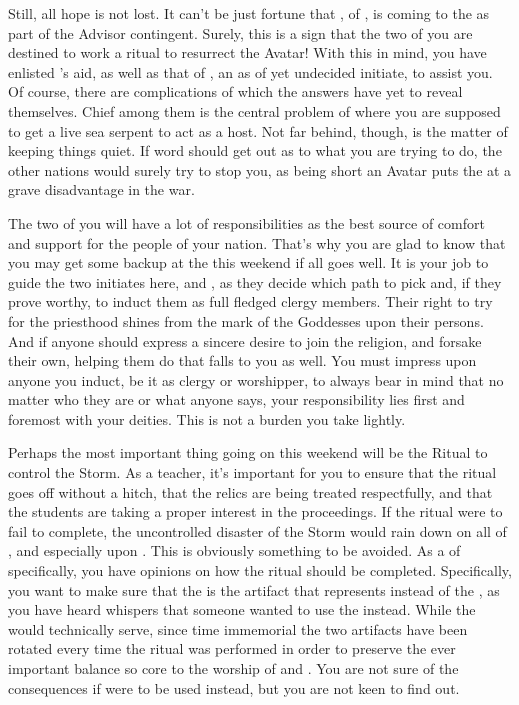 \documentclass[char]{GL2020}
\begin{document}
Still, all hope is not lost. It can’t be just fortune that \cEbbPriest{}, \cEbbPriest{\cleric} of \cEbb{}, is coming to the \pSchool{} as part of the \pShip{} Advisor contingent. Surely, this is a sign that the two of you are destined to work a ritual to resurrect the Avatar! With this in mind, you have enlisted \cEbbPriest{}’s aid, as well as that of \cInitiate{}, an as of yet undecided initiate, to assist you. Of course, there are complications of which the answers have yet to reveal themselves. Chief among them is the central problem of where you are supposed to get a live sea serpent to act as a host. Not far behind, though, is the matter of keeping things quiet. If word should get out as to what you are trying to do, the other nations would surely try to stop you, as being short an Avatar puts the \pShippies{} at a grave disadvantage in the war. 

The two of you will have a lot of responsibilities as the best source of comfort and support for the people of your nation. That’s why you are glad to know that you may get some backup at the \pSc{} this weekend if all goes well. It is your job to guide the two initiates here, \cInitiate{} and \cWarlordDaughter{}, as they decide which path to pick and, if they prove worthy, to induct them as full fledged clergy members. Their right to try for the priesthood shines from the mark of the Goddesses upon their persons. And if anyone should express a sincere desire to join the \pShip{} religion, and forsake their own, helping them do that falls to you as well. You must impress upon anyone you induct, be it as clergy or worshipper, to always bear in mind that no matter who they are or what anyone says, your responsibility lies first and foremost with your deities. This is not a burden you take lightly.

Perhaps the most important thing going on this weekend will be the Ritual to control the Storm. As a teacher, it’s important for you to ensure that the ritual goes off without a hitch, that the relics are being treated respectfully, and that the students are taking a proper interest in the proceedings. If the ritual were to fail to complete, the uncontrolled disaster of the Storm would rain down on all of \pEarth{}, and especially upon \pSc{}. This is obviously something to be avoided. As a \cFlowPriest{\cleric} of \cFlow{} specifically, you have opinions on how the ritual should be completed. Specifically, you want to make sure that the \iNet{} is the artifact that represents \pShip{} instead of the \iChalice{}, as you have heard whispers that someone wanted to use the \iChalice{} instead. While the \iChalice{} would technically serve, since time immemorial the two artifacts have been rotated every time the ritual was performed in order to preserve the ever important balance so core to the worship of \cEbb{} and \cFlow{}. You are not sure of the consequences if \iChalice{} were to be used instead, but you are not keen to find out.
\end{document}
